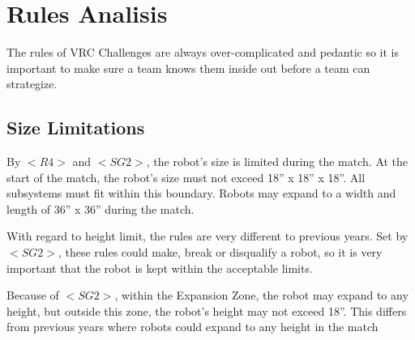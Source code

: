 \documentclass[../main.tex]{subfiles}
\begin{document}
\chapter{Rules Analisis}

The rules of VRC Challenges are always over-complicated and pedantic
so it is important to make sure a team knows them inside out before a team can
strategize.

\section{Size Limitations}

By $<R4>$ and $<SG2>$, the robot’s size is limited during the match. 
At the start of the match, the robot’s size must not exceed 18” x 18” x 18”. 
All subsystems must fit within this boundary.
Robots may expand to a width and length of 36” x 36” during the match. \par

With regard to height limit, the rules are very different to previous years.
Set by $<SG2>$, these rules could make, break or disqualify a robot,
so it is very important that the robot is kept within the acceptable limits. \par

Because of $<SG2>$, within the Expansion Zone, the robot may expand to any height,
but outside this zone, the robot’s height may not exceed 18”.
This differs from previous years where robots could expand to any height in the match 
\par
\end{document}
